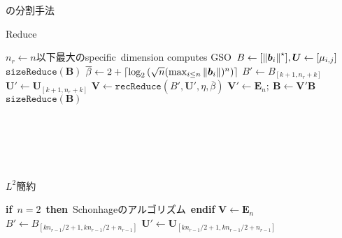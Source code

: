 \documentclass[12pt,aspectratio=169,table,dvipdfmx, leqno]{beamer}
\begin{document}
\begin{frame}{\cite{NS16}の分割手法}
\begin{minipage}[b]{0.45\columnwidth}
\begin{algorithm}[H]
    \footnotesize
    \begin{algorithmic}[1]
        \caption{\footnotesize Reduce\cite{NS16}}
        \label{alg_REDUCE}
        \State $n_r\gets n$以下最大のspecific~dimension
        \State computes GSO~$B\gets[\norm{\bm{b}_i}^\star], \bm{U}\gets [\mu_{i, j}]$
        \State $\texttt{sizeReduce}(\bm{B})$
        \State $\overline{\beta}\gets 2+\lceil \log_2{(\sqrt{n}(\max_{i\le n}\norm{\bm{b}_i})^n)}\rceil$
                \State $B'\gets B_{[k+1, n_r+k]}$
                \State $\bm{U}'\gets \bm{U}_{[k+1, n_r+k]}$
                \State $\bm{V}\gets\texttt{recReduce}(B', \bm{U}', \eta, \overline{\beta})$
                \State $\bm{V}'\gets \bm{E}_n;~\bm{B}\gets \bm{V}'\bm{B}$
                \State $\texttt{sizeReduce}(\bm{B})$
            \EndFor
        \EndFor
    \end{algorithmic}
\end{algorithm}
\mbox{}\\
\mbox{}\\
\mbox{}\\
\mbox{}\\
\end{minipage}
\hspace{0.03\columnwidth} %
\begin{minipage}[b]{0.45\columnwidth}
\begin{algorithm}[H]
    \footnotesize
    \begin{algorithmic}[1]
        \caption{\footnotesize $L^2$簡約\cite{Stehle10}}
        \label{alg_L2_2}
        \State \textbf{if}~$n=2$~\textbf{then}~Schonhageのアルゴリズム~\textbf{endif}
        \State $\bm{V}\gets \bm{E}_n$
                \State $B'\gets B_{[kn_{r-1}/2+1, kn_{r-1}/2+n_{r-1}]}$
                \State $\bm{U}'\gets \bm{U}_{[kn_{r-1}/2+1, kn_{r-1}/2+n_{r-1}]}$

\end{algorithmic}
\end{algorithm}
\end{minipage}
\end{frame}
\end{document}
